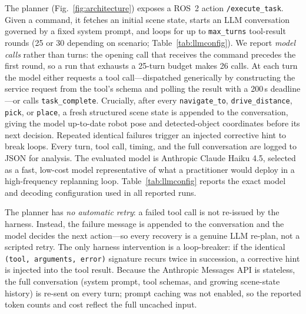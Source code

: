 \documentclass[conference]{IEEEtran}
\begin{document}
The planner (Fig.~\ref{fig:architecture}) exposes a ROS~2 action
\texttt{/execute\_task}. Given a command, it fetches an initial scene
state, starts an LLM conversation governed by a fixed system prompt, and
loops for up to \texttt{max\_turns} tool-result rounds (25 or 30 depending
on scenario; Table~\ref{tab:llmconfig}). We report \emph{model calls}
rather than turns: the opening call that receives the command precedes the
first round, so a run that exhausts a 25-turn budget makes 26 calls. At
each turn the
model either requests a tool call---dispatched generically by constructing
the service request from the tool's schema and polling the result with a
200\,s deadline---or calls \texttt{task\_complete}. Crucially, after every
\texttt{navigate\_to}, \texttt{drive\_distance}, \texttt{pick}, or
\texttt{place}, a fresh structured scene state is appended to the
conversation, giving the model up-to-date robot pose and detected-object
coordinates before its next decision. Repeated identical failures trigger
an injected corrective hint to break loops. Every turn, tool call, timing,
and the full conversation are logged to JSON for analysis. The evaluated
model is Anthropic Claude Haiku 4.5, selected as a fast, low-cost model
representative of what a practitioner would deploy in a high-frequency
replanning loop. Table~\ref{tab:llmconfig} reports the exact model and
decoding configuration used in all reported runs.

The planner has \emph{no automatic retry}: a failed tool call is not
re-issued by the harness. Instead, the failure message is appended to the
conversation and the model decides the next action---so every recovery is a
genuine LLM re-plan, not a scripted retry. The only harness intervention is
a loop-breaker: if the identical \texttt{(tool, arguments, error)} signature
recurs twice in succession, a corrective hint is injected into the tool
result. Because the Anthropic Messages API is stateless, the full
conversation (system prompt, tool schemas, and growing scene-state history)
is re-sent on every turn; prompt caching was not enabled, so the reported
token counts and cost reflect the full uncached input.
\end{document}
